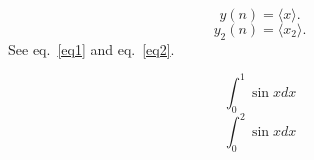 \documentclass[10pt]{book}
\begin{document}
\begin{equation} %
y(n) = \langle x\rangle. %
\label{eq1}
\end{equation} %
\begin{equation} %
y_2(n) 
\label{eq2}
= \langle x_2\rangle. %
\end{equation} %
See eq.~\ref{eq1} and eq.~\ref{eq2}.


\begin{equation}
  \label{test1}
  \int_0^1\sin x dx
\end{equation}
\begin{equation}
  \int_0^2\sin x dx
  \label{test2}
\end{equation}
\end{document}
